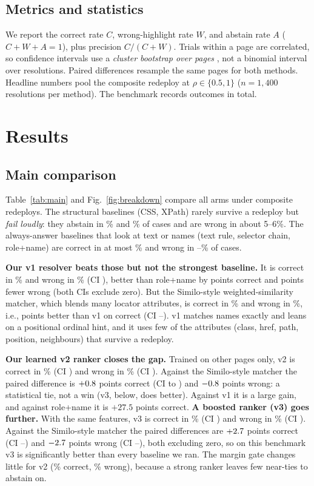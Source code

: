 \documentclass[conference]{IEEEtran}
\begin{document}
\subsection{Metrics and statistics}
We report the correct rate $C$, wrong-highlight rate $W$, and abstain rate $A$ ($C{+}W{+}A=1$), plus precision $C/(C{+}W)$. Trials within a page are correlated, so confidence intervals use a \emph{cluster bootstrap over pages} \cite{efron1979}, not a binomial interval over resolutions. Paired differences resample the same pages for both methods. Headline numbers pool the composite redeploy at $\rho\in\{0.5,1\}$ ($n{=}1{,}400$ resolutions per method). The benchmark records \nRows{} outcomes in total.

\section{Results}\label{sec:results}
\subsection{Main comparison}
Table~\ref{tab:main} and Fig.~\ref{fig:breakdown} compare all arms under composite redeploys. The structural baselines (CSS, XPath) rarely survive a redeploy but \emph{fail loudly}: they abstain in \cssA\% and \xpA\% of cases and are wrong in about 5--6\%. The always-answer baselines that look at text or names (text rule, selector chain, role+name) are correct in at most \rnC\% and wrong in \rnW--\chainW\% of cases.

\textbf{Our v1 resolver beats those but not the strongest baseline.} It is correct in \oursC\% and wrong in \oursW\% (CI \oursWci), better than role+name by \dCrn{} points correct and \dWrn{} points fewer wrong (both CIs exclude zero). But the Similo-style weighted-similarity matcher, which blends many locator attributes, is correct in \simC\% and wrong in \simW\%, i.e., \dCsim{} points better than v1 on correct (CI \dCsimLo--\dCsimHi). v1 matches names exactly and leans on a positional ordinal hint, and it uses few of the attributes (class, href, path, position, neighbours) that survive a redeploy.

\textbf{Our learned v2 ranker closes the gap.} Trained on other pages only, v2 is correct in \vTwoC\% (CI \vTwoCci) and wrong in \vTwoW\% (CI \vTwoWci). Against the Similo-style matcher the paired difference is $+0.8$ points correct (CI \dCvSimLo{} to \dCvSimHi) and $-0.8$ points wrong: a statistical tie, not a win (v3, below, does better). Against v1 it is a large gain, and against role+name it is $+27.5$ points correct. \textbf{A boosted ranker (v3) goes further.} With the same features, v3 is correct in \gbC\% (CI \gbCci) and wrong in \gbW\% (CI \gbWci). Against the Similo-style matcher the paired differences are $+2.7$ points correct (CI \dCgbLo--\dCgbHi) and $-2.7$ points wrong (CI \dWgbLo--\dWgbHi), both excluding zero, so on this benchmark v3 is significantly better than every baseline we ran. The margin gate changes little for v2 (\vTwomC\% correct, \vTwomW\% wrong), because a strong ranker leaves few near-ties to abstain on.
\end{document}
